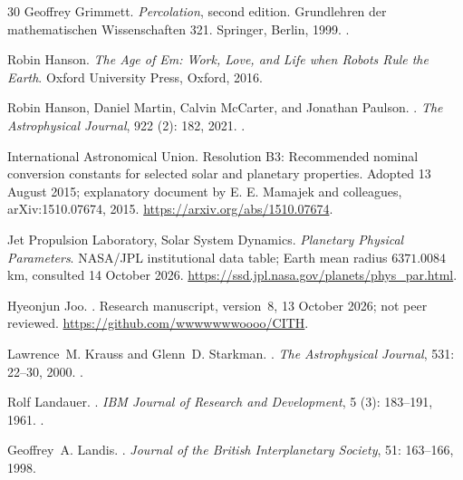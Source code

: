 \documentclass[11pt,a4paper]{article}
\theoremstyle{definition}
\begin{document}
\begin{thebibliography}{30}
Geoffrey Grimmett.
\newblock \emph{Percolation}, second edition.
\newblock Grundlehren der mathematischen Wissenschaften 321. Springer, Berlin,
  1999.
\newblock {}.

Robin Hanson.
\newblock \emph{The Age of Em: Work, Love, and Life when Robots Rule the
  Earth}.
\newblock Oxford University Press, Oxford, 2016.

Robin Hanson, Daniel Martin, Calvin McCarter, and Jonathan Paulson.
.
\newblock \emph{The Astrophysical Journal}, 922 (2): 182,
  2021.
\newblock {}.

International Astronomical Union.
\newblock Resolution B3: Recommended nominal conversion constants for
selected solar and planetary properties.
\newblock Adopted 13 August 2015; explanatory document by E. E. Mamajek
and colleagues, arXiv:1510.07674, 2015.
\newblock \url{https://arxiv.org/abs/1510.07674}.

Jet Propulsion Laboratory, Solar System Dynamics.
\newblock \emph{Planetary Physical Parameters}.
\newblock NASA/JPL institutional data table; Earth mean radius
  $6371.0084\,$km, consulted 14 October 2026.
\newblock \url{https://ssd.jpl.nasa.gov/planets/phys_par.html}.

Hyeonjun Joo.
.
\newblock Research manuscript, version~8, 13 October 2026; not peer reviewed.
\newblock \url{https://github.com/wwwwwwwoooo/CITH}.

Lawrence~M. Krauss and Glenn~D. Starkman.
.
\newblock \emph{The Astrophysical Journal}, 531: 22--30, 2000.
\newblock {}.

Rolf Landauer.
.
\newblock \emph{IBM Journal of Research and Development}, 5
  (3): 183--191, 1961.
\newblock {}.

Geoffrey~A. Landis.
.
\newblock \emph{Journal of the British Interplanetary Society}, 51:
  163--166, 1998.


\end{thebibliography}
\end{document}
